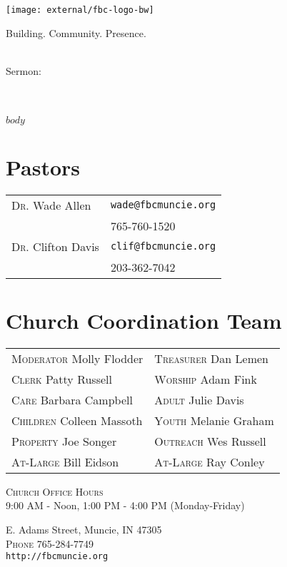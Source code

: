 \documentclass[
notumble,
nofoldmark,
letterpaper,
]{leaflet}
\begin{document}
\begin{titlepage}
\centering
\vfill
{\centering
\texttt{[image: external/fbc-logo-bw]}\par}
\vfill
\large Building. Community. Presence.
\vfill

\LARGE\sundaydate\\
\vfill
\large Sermon:\\
\LARGE\sermontitle\\
\LARGE\scripture\\

\vfill
\end{titlepage}
\thispagestyle{empty}

$body$

\vfill



\vfill



\vfill



\clearpage

\vfill



\vfill



\vfill

\section{Pastors}
\begin{tabular}{@{}ll}
\textsc{Dr.} Wade Allen & \verb|wade@fbcmuncie.org|\\ 
 & 765-760-1520 \\
 \textsc{Dr.} Clifton Davis & \verb|clif@fbcmuncie.org|\\ 
 & 203-362-7042 \\
\end{tabular}

\section{Church Coordination Team}
\begin{tabular}{@{}ll}
\textsc{Moderator} Molly Flodder & \textsc{Treasurer} Dan Lemen\\
\textsc{Clerk} Patty Russell & \textsc{Worship} Adam Fink\\
\textsc{Care} Barbara Campbell & \textsc{Adult} Julie Davis \\
\textsc{Children} Colleen Massoth & \textsc{Youth} Melanie Graham \\
\textsc{Property} Joe Songer & \textsc{Outreach} Wes Russell \\
\textsc{At-Large} Bill Eidson & \textsc{At-Large} Ray Conley \\
\end{tabular}

\medskip

\centering
\textsc{Church Office Hours} \\
9:00 AM - Noon, 1:00 PM - 4:00 PM (Monday-Friday)

\medskip

 E. Adams Street, Muncie, IN 47305\\
\textsc{Phone} 765-284-7749\\
\texttt{http://fbcmuncie.org}

\loggingall
\end{document}
